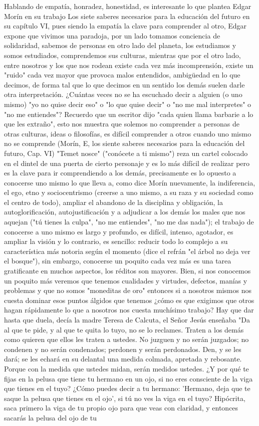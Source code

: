 Hablando de empatía, honradez, honestidad, es interesante lo que plantea Edgar Morín en su trabajo Los siete saberes necesarios para la educación del futuro en su capítulo VI, pues siendo la empatía la clave para comprender al otro, Edgar expone que vivimos una paradoja, por un lado tomamos conciencia de solidaridad, sabemos de personas en otro lado del planeta, los estudiamos y somos estudiados, comprendemos sus culturas, mientras que por el otro lado, entre nosotros y los que nos rodean existe cada vez más incomprensión, existe un "ruido" cada vez mayor que provoca malos entendidos, ambigüedad en lo que decimos, de forma tal que lo que decimos en un sentido los demás suelen darle otra interpretación. ¿Cuántas veces no se ha escuchado decir a alguien (o uno mismo) "yo no quise decir eso" o "lo que quise decir" o "no me mal interpretes" o "no me entiendes"? Recuerdo que un escritor dijo "cada quien llama barbarie a lo que les extraño", esto nos muestra que solemos no comprender a personas de otras culturas, ideas o filosofías, es difícil comprender a otros cuando uno mismo no se comprende (Morín, E, los siente saberes necesarios para la educación del futuro, Cap. VI) "Temet nosce" ("conócete a ti mismo") reza un cartel colocado en el dintel de una puerta de cierto personaje y es lo más difícil de realizar pero es la clave para ir comprendiendo a los demás, precisamente es lo opuesto a conocerse uno mismo lo que lleva a, como dice Morín nuevamente, la indiferencia, el ego, etno y sociocentrismo (creerse a uno mismo, a su raza y su sociedad como el centro de todo), ampliar el abandono de la disciplina y obligación, la autoglorificación, autojustificación y a adjudicar a los demás los males que nos aquejan ("tú tienes la culpa", "no me entiendes", "no me das nada"); el trabajo de conocerse a uno mismo es largo y profundo, es difícil, intenso, agotador, es ampliar la visión y lo contrario, es sencillo: reducir todo lo complejo a su característica más notoria según el momento (dice el refrán "el árbol no deja ver el bosque"), sin embargo, conocerse un poquito cada vez más es una tarea gratificante en muchos aspectos, los réditos son mayores. Bien, si nos conocemos un poquito más veremos que tenemos cualidades y virtudes, defectos, manías y problemas y que no somos "moneditas de oro" entonces si a nosotros mismos nos cuesta dominar esos puntos álgidos que tenemos ¿cómo es que exigimos que otros hagan rápidamente lo que a nosotros nos cuesta muchísimo trabajo? Hay que dar hasta que duela, decía la madre Teresa de Calcuta, el Señor Jesús enseñaba "Da al que te pide, y al que te quita lo tuyo, no se lo reclames. Traten a los demás como quieren que ellos les traten a ustedes. No juzguen y no serán juzgados; no condenen y no serán condenados; perdonen y serán perdonados. Den, y se les dará; se les echará en su delantal una medida colmada, apretada y rebosante. Porque con la medida que ustedes midan, serán medidos ustedes. ¿Y por qué te fijas en la pelusa que tiene tu hermano en un ojo, si no eres consciente de la viga que tienes en el tuyo? ¿Cómo puedes decir a tu hermano: 'Hermano, deja que te saque la pelusa que tienes en el ojo', si tú no ves la viga en el tuyo? Hipócrita, saca primero la viga de tu propio ojo para que veas con claridad, y entonces sacarás la pelusa del ojo de tu 